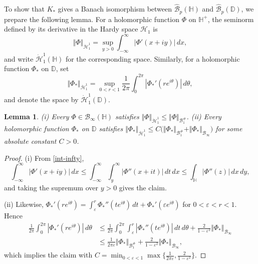 \documentclass[amstex,12pt,reqno]{amsart}
\newtheorem{lemma}[theorem]{Lemma}
\theoremstyle{definition}
\begin{document}
To show that $K_*$ gives a Banach isomorphism between 
$\widehat{\mathcal B}_p(\mathbb H)$ and $\widehat{\mathcal B}_p(\mathbb D)$, we prepare the following lemma.
For a holomorphic function $\Phi$ on $\mathbb H^+$, the seminorm defined by
its derivative in the Hardy space $\mathcal H_1$ is 
\begin{equation}\label{h1H}
\Vert \Phi \Vert_{\dot {\mathcal H}_1^1}=\sup_{y>0}\int_{-\infty}^{\infty} |\Phi'(x+iy)|\,dx,
\end{equation}
and write $\dot {\mathcal H}_1^1(\mathbb H)$ for the corresponding space.
Similarly, for a holomorphic function $\Phi_*$ on $\mathbb D$, set
\begin{equation}\label{h1D}
\Vert \Phi_* \Vert_{\dot {\mathcal H}_1^1}=\sup_{0<r<1} \frac{1}{2\pi}\int_{0}^{2\pi} |\Phi_*'(re^{i\theta})|\,d\theta,
\end{equation}
and denote the space by $\dot {\mathcal H}_1^1(\mathbb D)$. 

\begin{lemma}\label{hardy}
{\rm (i)} 
Every $\Phi \in \mathcal B_\infty(\mathbb H)$ satisfies
$\Vert \Phi \Vert_{\dot {\mathcal H}_1^1} \leq \Vert \Phi \Vert_{{\mathcal B}_1^{\#}}$.
{\rm (ii)} Every holomorphic function $\Phi_*$ on $\mathbb D$ satisfies
$\Vert \Phi_* \Vert_{\dot {\mathcal H}_1^1} \leq C
\bigl(\Vert \Phi_* \Vert_{\mathcal B_1^{\#}}+\Vert \Phi_* \Vert_{{\mathcal B}_\infty}\bigr)$ for some absolute constant $C>0$.
\end{lemma}

\begin{proof}
(i) From \eqref{int-infty},
$$
\int_{-\infty}^\infty |\Phi'(x+iy)|\,dx \leq \int_{-\infty}^\infty\int_{y}^{\infty} |\Phi''(x+it)|\,dt\,dx
\leq \int_{\mathbb H} |\Phi''(z)|\,dx\,dy,
$$
and taking the supremum over $y>0$ gives the claim.

(ii) Likewise, $\Phi_*'(re^{i\theta})=\int_{\varepsilon}^r \Phi_*''(te^{i\theta})\,dt+\Phi_*'(\varepsilon e^{i\theta})$ for $0<\varepsilon<r<1$.
Hence
\begin{align}
\frac{1}{2\pi}\int_0^{2\pi} |\Phi_*'(re^{i\theta})| \,d\theta 
&\leq \frac{1}{2\pi}\int_0^{2\pi}
\int_{\varepsilon}^r |\Phi_*''(te^{i\theta})|\,dt\,d\theta+\frac{2}{1-\varepsilon^2}\Vert \Phi_* \Vert_{{\mathcal B}_\infty}\\
&\leq \frac{1}{2\pi \varepsilon}\Vert \Phi_* \Vert_{{\mathcal B}_1^{\#}}+\frac{2}{1-\varepsilon^2}\Vert \Phi_* \Vert_{{\mathcal B}_\infty},
\end{align}
which implies the claim with $C=\min_{0<\varepsilon <1} \max\{\tfrac{1}{2\pi \varepsilon},\tfrac{2}{1-\varepsilon^2}\}$.
\end{proof}
\end{document}
